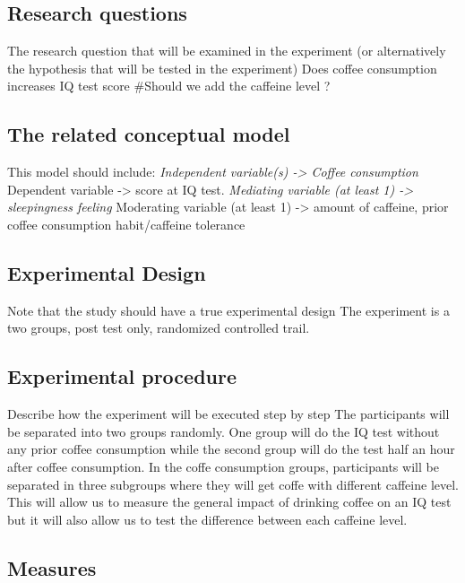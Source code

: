 \documentclass[]{article}
\begin{document}
\subsection{Research questions}\label{research-questions}

The research question that will be examined in the experiment (or
alternatively the hypothesis that will be tested in the experiment) Does
coffee consumption increases IQ test score \#Should we add the caffeine
level ?

\subsection{The related conceptual
model}\label{the-related-conceptual-model}

This model should include: \emph{Independent variable(s) -\textgreater{}
Coffee consumption }Dependent variable -\textgreater{} score at IQ test.
\emph{Mediating variable (at least 1) -\textgreater{} sleepingness
feeling }Moderating variable (at least 1) -\textgreater{} amount of
caffeine, prior coffee consumption habit/caffeine tolerance

\subsection{Experimental Design}\label{experimental-design}

Note that the study should have a true experimental design The
experiment is a two groups, post test only, randomized controlled trail.

\subsection{Experimental procedure}\label{experimental-procedure}

Describe how the experiment will be executed step by step The
participants will be separated into two groups randomly. One group will
do the IQ test without any prior coffee consumption while the second
group will do the test half an hour after coffee consumption. In the
coffe consumption groups, participants will be separated in three
subgroups where they will get coffe with different caffeine level. This
will allow us to measure the general impact of drinking coffee on an IQ
test but it will also allow us to test the difference between each
caffeine level.

\subsection{Measures}\label{measures}
\end{document}
